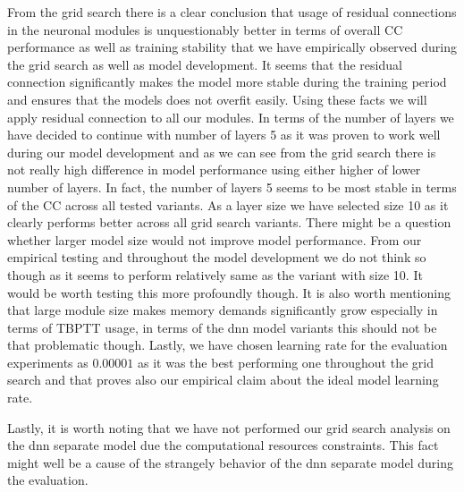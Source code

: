 From the grid search there is a clear conclusion that usage of residual connections in the neuronal modules is unquestionably better in terms of overall CC performance as well as training stability that we have empirically observed during the grid search as well as model development. It seems that the residual connection significantly makes the model more stable during the training period and ensures that the models does not overfit easily. Using these facts we will apply residual connection to all our modules. In terms of the number of layers we have decided to continue with number of layers 5 as it was proven to work well during our model development and as we can see from the grid search there is not really high difference in model performance using either higher of lower number of layers. In fact, the number of layers 5 seems to be most stable in terms of the CC across all tested variants. As a layer size we have selected size 10 as it clearly performs better across all grid search variants. There might be a question whether larger model size would not improve model performance. From our empirical testing and throughout the model development we do not think so though as it seems to perform relatively same as the variant with size 10. It would be worth testing this more profoundly though. It is also worth mentioning that large module size makes memory demands significantly grow especially in terms of TBPTT usage, in terms of the dnn model variants this should not be that problematic though. Lastly, we have chosen learning rate for the evaluation experiments as $0.00001$ as it was the best performing one throughout the grid search and that proves also our empirical claim about the ideal model learning rate.

Lastly, it is worth noting that we have not performed our grid search analysis on the dnn separate model due the computational resources constraints. This fact might well be a cause of the strangely behavior of the dnn separate model during the evaluation.


